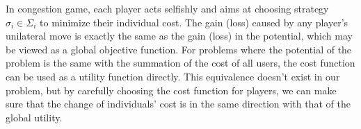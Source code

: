 %
%
%
In congestion game, each player acts selfishly and aims at choosing strategy $\sigma_i\in \Sigma_i$ to minimize their individual cost.
The gain (loss) caused by any player's unilateral move is exactly the same as the gain (loss) in the potential, which may be viewed as a global objective function. For problems where the potential of the problem is the same with the summation of the cost of all users, the cost function can be used as a utility function directly. This equivalence doesn't exist in our problem, but by carefully choosing the cost function for players, we can make sure that the change of individuals' cost is in the same direction with that of the global utility.


